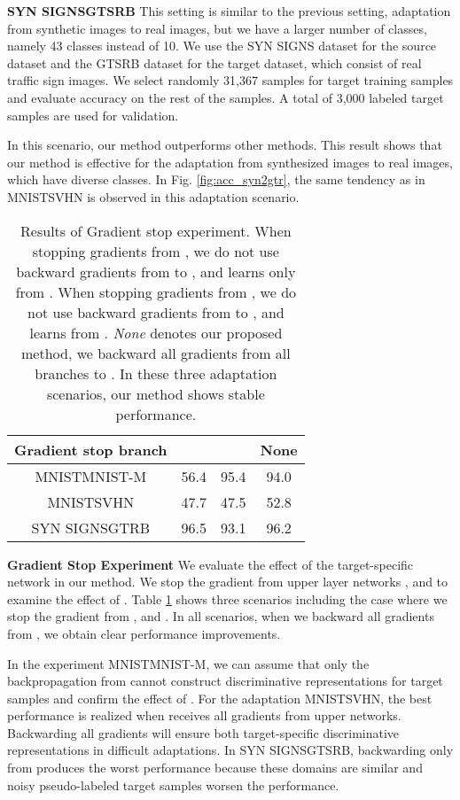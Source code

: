 \documentclass{article}
\begin{document}
\textbf{SYN SIGNSGTSRB}
This setting is similar to the previous setting, adaptation from synthetic images to real images, but we have a larger number of classes, namely 43 classes instead of 10. We use the SYN SIGNS dataset \cite{ganin2014unsupervised} for the source dataset and the GTSRB dataset \cite{stallkamp2011german} for the target dataset, which consist of real traffic sign images. We select randomly 31,367 samples for target training samples and evaluate accuracy on the rest of the samples. A total of 3,000 labeled target samples are used for validation.

In this scenario, our method outperforms other methods. This result shows that our method is effective for the adaptation from synthesized images to real images, which have diverse classes. In Fig. \ref{fig:acc_syn2gtr}, the same tendency as in MNISTSVHN is observed in this adaptation scenario.
\begin{table}
\begin{center}
\begin{tabular}{c|ccc}
\hline
\abovespace\belowspace
{Gradient stop branch}&{\scriptsize }&{\scriptsize }&{\scriptsize	None}\\\hline
MNISTMNIST-M&56.4&95.4&94.0\\\hline
 MNISTSVHN&47.7&47.5&52.8\\\hline
 SYN SIGNSGTRB&96.5&93.1&96.2\\\hline
\end{tabular}
\caption{Results of Gradient stop experiment. When stopping gradients from , we do not use backward gradients from  to , and  learns only from . When stopping gradients from , we do not use backward gradients from  to , and  learns from . \textit{None} denotes our proposed method, we backward all gradients from all branches to . In these three adaptation scenarios, our method shows stable performance.}
\label{table:stop_grad}
\end{center}
\end{table}

\textbf{Gradient Stop Experiment}
We evaluate the effect of the target-specific network in our method. We stop the gradient from upper layer networks , and  to examine the effect of . Table \ref{table:stop_grad} shows three scenarios including the case where we stop the gradient from , and . In all scenarios, when we backward all gradients from , we obtain clear performance improvements.

In the experiment MNISTMNIST-M, we can assume that only the backpropagation from  cannot construct discriminative representations for target samples and confirm the effect of .
For the adaptation MNISTSVHN, the best performance is realized when  receives all gradients from upper networks. Backwarding all gradients will ensure both target-specific discriminative representations in difficult adaptations.
In SYN SIGNSGTSRB, backwarding only from  produces the worst performance because these domains are similar and noisy pseudo-labeled target samples worsen the performance.
\end{document}
